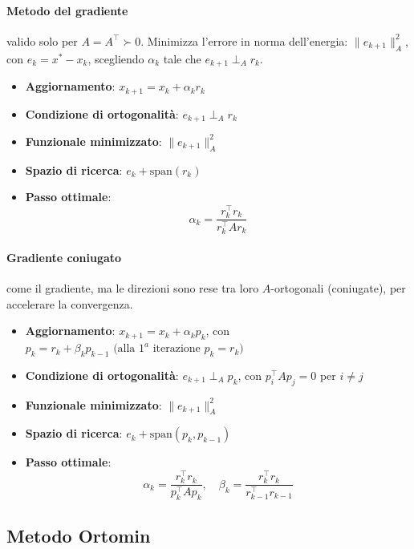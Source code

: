 \documentclass[12pt,a4paper]{article}
\begin{document}
\paragraph{Metodo del gradiente}
 valido solo per \( A = A^\top \succ 0 \). Minimizza l’errore in norma dell’energia: \( \|e_{k+1}\|_A^2 \), con \( e_k = x^* - x_k \), scegliendo \( \alpha_k \) tale che \( e_{k+1} \perp_A r_k \).
\begin{itemize}
    \item \textbf{Aggiornamento}: \( x_{k+1} = x_k + \alpha_k r_k \)
    \item \textbf{Condizione di ortogonalità}: \( e_{k+1} \perp_A r_k \)
    \item \textbf{Funzionale minimizzato}: \( \|e_{k+1}\|_A^2 \)
    \item \textbf{Spazio di ricerca}: \( e_k + \text{span}(r_k) \)
    \item \textbf{Passo ottimale}:
    \[
    \alpha_k = \frac{r_k^\top r_k}{r_k^\top A r_k}
    \]
\end{itemize}

\paragraph{Gradiente coniugato}
 come il gradiente, ma le direzioni sono rese tra loro \( A \)-ortogonali (coniugate), per accelerare la convergenza.
\begin{itemize}
    \item \textbf{Aggiornamento}: \( x_{k+1} = x_k + \alpha_k p_k \), con \( p_k = r_k + \beta_k p_{k-1} \text{ (alla $1^a$ iterazione }p_k=r_k)\)
    \item \textbf{Condizione di ortogonalità}: \( e_{k+1} \perp_A p_k \), con \( p_i^\top A p_j = 0 \) per \( i \ne j \)
    \item \textbf{Funzionale minimizzato}: \( \|e_{k+1}\|_A^2 \)
    \item \textbf{Spazio di ricerca}: \( e_k + \text{span}(p_k, p_{k-1}) \)
    \item \textbf{Passo ottimale}:
    \[
    \alpha_k = \frac{r_k^\top r_k}{p_k^\top A p_k}, \quad \beta_k = \frac{r_k^\top r_k}{r_{k-1}^\top r_{k-1}}
    \]
\end{itemize}


\newpage
\subsection*{Metodo Ortomin}
\end{document}
